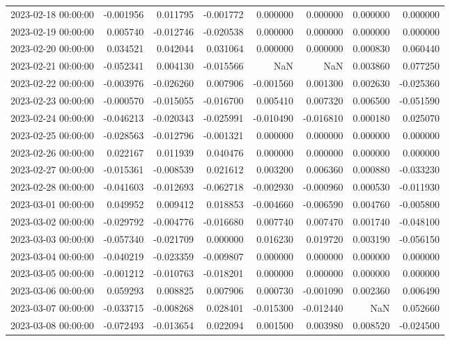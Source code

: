 \begin{tabular}{lrrrrrrr}
2023-02-18 00:00:00 & -0.001956 & 0.011795 & -0.001772 & 0.000000 & 0.000000 & 0.000000 & 0.000000 \\
2023-02-19 00:00:00 & 0.005740 & -0.012746 & -0.020538 & 0.000000 & 0.000000 & 0.000000 & 0.000000 \\
2023-02-20 00:00:00 & 0.034521 & 0.042044 & 0.031064 & 0.000000 & 0.000000 & 0.000830 & 0.060440 \\
2023-02-21 00:00:00 & -0.052341 & 0.004130 & -0.015566 & NaN & NaN & 0.003860 & 0.077250 \\
2023-02-22 00:00:00 & -0.003976 & -0.026260 & 0.007906 & -0.001560 & 0.001300 & 0.002630 & -0.025360 \\
2023-02-23 00:00:00 & -0.000570 & -0.015055 & -0.016700 & 0.005410 & 0.007320 & 0.006500 & -0.051590 \\
2023-02-24 00:00:00 & -0.046213 & -0.020343 & -0.025991 & -0.010490 & -0.016810 & 0.000180 & 0.025070 \\
2023-02-25 00:00:00 & -0.028563 & -0.012796 & -0.001321 & 0.000000 & 0.000000 & 0.000000 & 0.000000 \\
2023-02-26 00:00:00 & 0.022167 & 0.011939 & 0.040476 & 0.000000 & 0.000000 & 0.000000 & 0.000000 \\
2023-02-27 00:00:00 & -0.015361 & -0.008539 & 0.021612 & 0.003200 & 0.006360 & 0.000880 & -0.033230 \\
2023-02-28 00:00:00 & -0.041603 & -0.012693 & -0.062718 & -0.002930 & -0.000960 & 0.000530 & -0.011930 \\
2023-03-01 00:00:00 & 0.049952 & 0.009412 & 0.018853 & -0.004660 & -0.006590 & 0.004760 & -0.005800 \\
2023-03-02 00:00:00 & -0.029792 & -0.004776 & -0.016680 & 0.007740 & 0.007470 & 0.001740 & -0.048100 \\
2023-03-03 00:00:00 & -0.057340 & -0.021709 & 0.000000 & 0.016230 & 0.019720 & 0.003190 & -0.056150 \\
2023-03-04 00:00:00 & -0.040219 & -0.023359 & -0.009807 & 0.000000 & 0.000000 & 0.000000 & 0.000000 \\
2023-03-05 00:00:00 & -0.001212 & -0.010763 & -0.018201 & 0.000000 & 0.000000 & 0.000000 & 0.000000 \\
2023-03-06 00:00:00 & 0.059293 & 0.008825 & 0.007906 & 0.000730 & -0.001090 & 0.002360 & 0.006490 \\
2023-03-07 00:00:00 & -0.033715 & -0.008268 & 0.028401 & -0.015300 & -0.012440 & NaN & 0.052660 \\
2023-03-08 00:00:00 & -0.072493 & -0.013654 & 0.022094 & 0.001500 & 0.003980 & 0.008520 & -0.024500 \\

\end{tabular}
